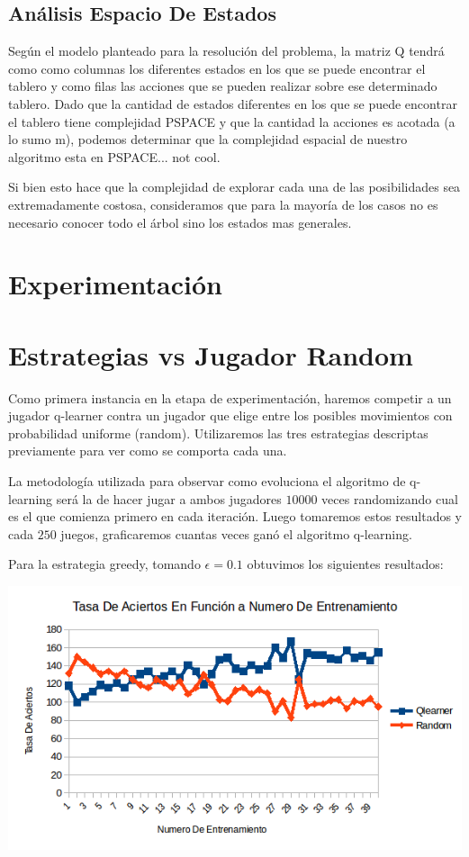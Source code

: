 \subsection{Análisis Espacio De Estados}

Según el modelo planteado para la resolución del problema, la matriz Q tendrá como como columnas los diferentes estados en los que se puede encontrar el tablero y como filas las acciones que se pueden realizar sobre ese determinado tablero. Dado que la cantidad de estados diferentes en los que se puede encontrar el tablero tiene complejidad PSPACE y que la cantidad la acciones es acotada (a lo sumo m), podemos determinar que la complejidad espacial de nuestro algoritmo esta en PSPACE... not cool.

Si bien esto hace que la complejidad de explorar cada una de las posibilidades sea extremadamente costosa, consideramos que para la mayoría de los casos no es necesario conocer todo el árbol sino los estados mas generales.



\pagebreak
\section{Experimentación}

\section{Estrategias vs Jugador Random}

Como primera instancia en la etapa de experimentación, haremos competir a un jugador q-learner contra un jugador que elige entre los posibles movimientos con probabilidad uniforme (random). Utilizaremos las tres estrategias descriptas previamente para ver como se comporta cada una. 

La metodología utilizada para observar como evoluciona el algoritmo de q-learning será la de hacer jugar a ambos jugadores $10000$ veces randomizando cual es el que comienza primero en cada iteración. Luego tomaremos estos resultados y cada $250$ juegos, graficaremos cuantas veces ganó el algoritmo q-learning. 

Para la estrategia greedy, tomando $\epsilon=0.1$ obtuvimos los siguientes resultados:

\includegraphics[scale=0.5]{testing/greedy.png}

